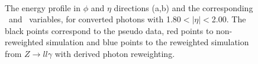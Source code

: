 \begin{figure}[ht]
    \centering
	 \\
    \caption{The energy profile in $\phi$ and $\eta$ directions (a,b) and the corresponding \Rphi \ and \Reta \ variables, for converted photons with 1.80$<|\eta|<$2.00. The black points correspond to the pseudo data, red points to non-reweighted simulation and blue points to the reweighted simulation from $Z\rightarrow ll\gamma$ with derived photon reweighting.}
    \label{Photon:4}
\end{figure}


